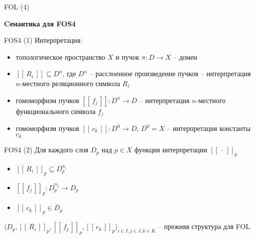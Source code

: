 \documentclass{beamer}
\begin{document}
\begin{frame}{FOL (4)}
\begin{center}
	\begin{figure}[H]
	\end{figure}
\end{center}
\end{frame}



\begin{frame}{}
\begin{center}
	\textbf{Cемантика для FOS4}
\end{center}
\end{frame}

\begin{frame}{FOS4 (1)}
Интерпретация:\\
\medskip
{\small
\begin{itemize}
	\item топологическое пространство $X$ и пучок $\pi : D \to X$ -- домен
	\item $[ \! [ \, R_i \, ] \! ] \subseteq D^n$, где $D^n$ -- расслоенное произведение пучков -- интерпретация $n$-местного реляционного символа $R_i$
	\item гомоморфизм пучков $[ \! [ \, f_j \, ] \! ] : D^n \to D$ -- интерпретация $n$-местного функционального символа $f_j$ 
	\item гомоморфизм пучков $[ \! [ \, c_k \, ] \! ] : D^0 \to D$, $D^0 = X$ -- интерпретация константы $c_k$
\end{itemize}
}
\end{frame}

\begin{frame}{FOS4 (2)}
Для каждого слоя $D_p$ над $p \in X$ функция интерпретации $[ \! [ \, \cdot \, ] \! ]_p$\\
\medskip
{\small
\begin{itemize}
	\item $[ \! [ \, R_i \, ] \! ]_p \subseteq D_p^{n_i}$
	\item $[ \! [ \, f_j \, ] \! ]_p : D_p^{n_j} \to D_p$
	\item $[ \! [ \, c_k \, ] \! ]_p \in D_p$
\end{itemize}
}
\medskip
{\small $\langle D_p, [ \! [ \, R_i \, ] \! ]_p, [ \! [ \, f_j \, ] \! ]_p, [ \! [ \, c_k \, ] \! ]_p \rangle_{i \in I, j \in J, k \in K}$ -- прежняя структура для FOL}
\end{frame}
\end{document}
